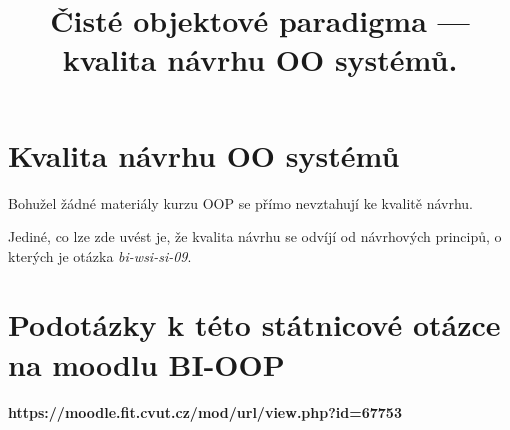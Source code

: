 \documentclass{szzclass}
\title{Čisté objektové paradigma — kvalita návrhu OO systémů.}
\begin{document}
\maketitle

\tableofcontents
\newpage

\section{Kvalita návrhu OO systémů}

Bohužel žádné materiály kurzu OOP se přímo nevztahují ke kvalitě návrhu.

Jediné, co lze zde uvést je, že kvalita návrhu se odvíjí od návrhových principů, o kterých je otázka
\textit{bi-wsi-si-09}.

\section{Podotázky k této státnicové otázce na moodlu BI-OOP}

\textbf{https://moodle.fit.cvut.cz/mod/url/view.php?id=67753}
\end{document}

